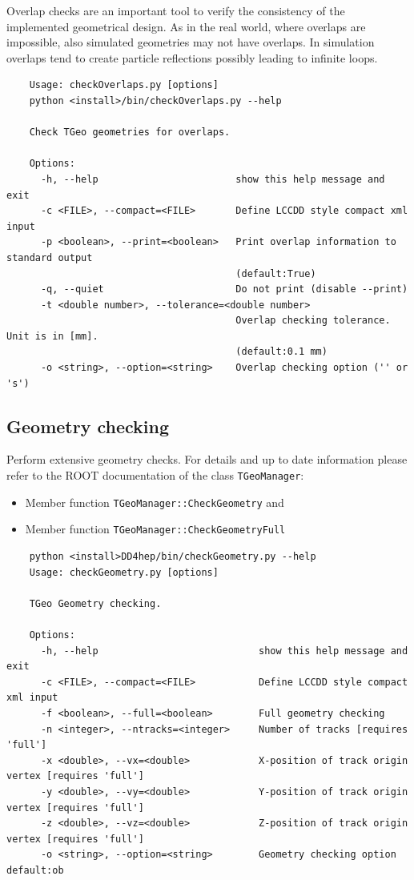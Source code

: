 Overlap checks are an important tool to verify the consistency of the  implemented geometrical design. As in the real world, where overlaps are  impossible, also simulated geometries may not have overlaps. In simulation overlaps tend to create particle reflections possibly leading to infinite loops.
\begin{verbatim}
    Usage: checkOverlaps.py [options]
    python <install>/bin/checkOverlaps.py --help

    Check TGeo geometries for overlaps.

    Options:
      -h, --help                        show this help message and exit
      -c <FILE>, --compact=<FILE>       Define LCCDD style compact xml input
      -p <boolean>, --print=<boolean>   Print overlap information to standard output
                                        (default:True)
      -q, --quiet                       Do not print (disable --print)
      -t <double number>, --tolerance=<double number>
                                        Overlap checking tolerance. Unit is in [mm].
                                        (default:0.1 mm)
      -o <string>, --option=<string>    Overlap checking option ('' or 's')
\end{verbatim}

\subsection{Geometry checking}
\label{sec:dd4hep-manual-geometry-checking}

Perform extensive geometry checks. For details and up to date information  please refer to the ROOT documentation of the class {\texttt{TGeoManager}}:
\begin{itemize}
\item Member function \texttt{TGeoManager::CheckGeometry} and 
\item Member function \texttt{TGeoManager::CheckGeometryFull}
\end{itemize}

\begin{verbatim}
    python <install>DD4hep/bin/checkGeometry.py --help
    Usage: checkGeometry.py [options]

    TGeo Geometry checking.

    Options:
      -h, --help                            show this help message and exit
      -c <FILE>, --compact=<FILE>           Define LCCDD style compact xml input
      -f <boolean>, --full=<boolean>        Full geometry checking
      -n <integer>, --ntracks=<integer>     Number of tracks [requires 'full']
      -x <double>, --vx=<double>            X-position of track origin vertex [requires 'full']
      -y <double>, --vy=<double>            Y-position of track origin vertex [requires 'full']
      -z <double>, --vz=<double>            Z-position of track origin vertex [requires 'full']
      -o <string>, --option=<string>        Geometry checking option default:ob
\end{verbatim}

